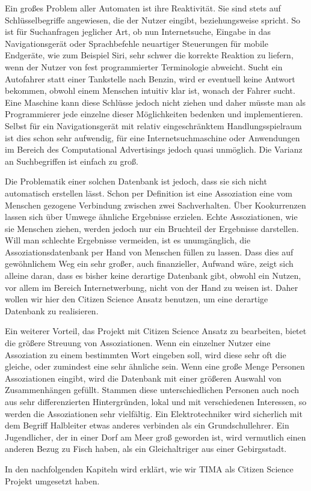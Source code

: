 Ein großes Problem aller Automaten ist ihre Reaktivität. Sie sind stets auf Schlüsselbegriffe angewiesen, die der Nutzer eingibt, beziehungsweise spricht.  So ist für Suchanfragen jeglicher Art, ob nun Internetsuche, Eingabe in das Navigationsgerät oder Sprachbefehle neuartiger Steuerungen für mobile Endgeräte, wie zum Beispiel Siri, sehr schwer die korrekte Reaktion zu liefern, wenn der Nutzer von fest programmierter Terminologie abweicht. Sucht ein Autofahrer statt einer Tankstelle nach Benzin, wird er eventuell keine Antwort bekommen, obwohl einem Menschen intuitiv klar ist, wonach der Fahrer sucht. Eine Maschine kann diese Schlüsse jedoch nicht ziehen und daher müsste man als Programmierer jede einzelne dieser Möglichkeiten bedenken und implementieren. Selbst für ein Navigationsgerät mit relativ eingeschränktem Handlungsspielraum ist dies schon sehr aufwendig, für eine Internetsuchmaschine oder Anwendungen im Bereich des Computational Advertisings jedoch quasi unmöglich. Die Varianz an Suchbegriffen ist einfach zu groß.

Die Problematik einer solchen Datenbank ist jedoch, dass sie sich nicht automatisch erstellen lässt. Schon per Definition ist eine Assoziation eine vom Menschen gezogene Verbindung zwischen zwei Sachverhalten. Über Kookurrenzen lassen sich über Umwege ähnliche Ergebnisse erzielen. %
Echte Assoziationen, wie sie Menschen ziehen, werden jedoch nur ein Bruchteil der Ergebnisse darstellen. Will man schlechte Ergebnisse vermeiden, ist es unumgänglich, die Assoziationsdatenbank per Hand von Menschen füllen zu lassen. Dass dies auf gewöhnlichem Weg ein sehr großer, auch finanzieller, Aufwand wäre, zeigt sich alleine daran, dass es bisher keine derartige Datenbank gibt, obwohl ein Nutzen, vor allem im Bereich Internetwerbung, nicht von der Hand zu weisen ist. Daher wollen wir hier den Citizen Science Ansatz benutzen, um eine derartige Datenbank zu realisieren.

Ein weiterer Vorteil, das Projekt mit Citizen Science Ansatz zu bearbeiten, bietet die größere Streuung von Assoziationen. Wenn ein einzelner Nutzer eine Assoziation zu einem bestimmten Wort eingeben soll, wird diese sehr oft die gleiche, oder zumindest eine sehr ähnliche sein. Wenn eine große Menge Personen Assoziationen eingibt, wird die Datenbank mit einer größeren Auswahl von Zusammenhängen gefüllt. Stammen diese unterschiedlichen Personen auch noch aus sehr differenzierten Hintergründen, lokal und mit verschiedenen Interessen, so werden die Assoziationen sehr vielfältig. Ein Elektrotechniker wird sicherlich mit dem Begriff Halbleiter etwas anderes verbinden als ein Grundschullehrer. Ein Jugendlicher, der in einer Dorf am Meer groß geworden ist, wird vermutlich einen anderen Bezug zu Fisch haben, als ein Gleichaltriger aus einer Gebirgsstadt.

In den nachfolgenden Kapiteln wird erklärt, wie wir TIMA als Citizen Science Projekt umgesetzt haben.
